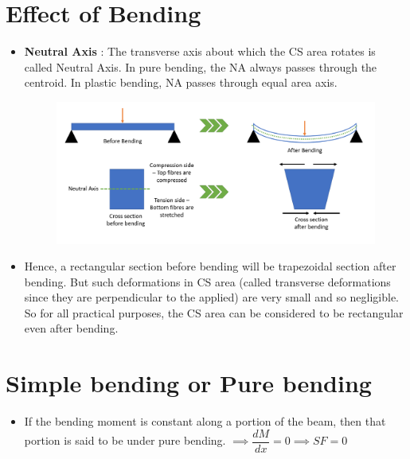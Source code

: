 \documentclass[8pt]{report}
\begin{document}
	\section{Effect of Bending}
		\begin{itemize}
			\item \textbf{Neutral Axis} : The transverse axis about which the CS area rotates is called Neutral Axis. In pure bending, the NA always passes through the centroid. In plastic bending, NA passes through equal area axis.
			\begin{figure}[H]
				\centering
				\includegraphics[scale=0.4]{effectofbending.png}
			\end{figure}
			\item Hence, a rectangular section before bending will be trapezoidal section after bending. But such deformations in CS area (called transverse deformations since they are perpendicular to the applied) are very small and so negligible. So for all practical purposes, the CS area can be considered to be rectangular even after bending.
		\end{itemize}\hrulefill
	\section{Simple bending or Pure bending}
		\begin{itemize}
			\item If the bending moment is constant along a portion of the beam, then that portion is said to be under pure bending. $\implies \dfrac{dM}{dx} = 0 \implies SF = 0$
		\end{itemize}
\end{document}
